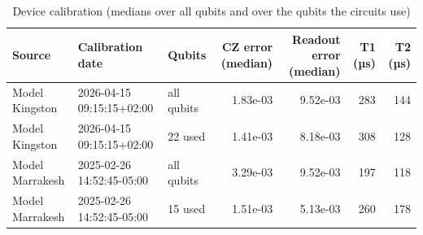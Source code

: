 \begin{table}[t]
\centering
\small
\caption{Device calibration (medians over all qubits and over the qubits the circuits use)}
\label{tab:calibration}
\begin{tabular}{lllrrrr}
\toprule
Source & Calibration date & Qubits & CZ error (median) & Readout error (median) & T1 (µs) & T2 (µs) \\
\midrule
Model Kingston & 2026-04-15 09:15:15+02:00 & all qubits & 1.83e-03 & 9.52e-03 & 283 & 144 \\
Model Kingston & 2026-04-15 09:15:15+02:00 & 22 used & 1.41e-03 & 8.18e-03 & 308 & 128 \\
Model Marrakesh & 2025-02-26 14:52:45-05:00 & all qubits & 3.29e-03 & 9.52e-03 & 197 & 118 \\
Model Marrakesh & 2025-02-26 14:52:45-05:00 & 15 used & 1.51e-03 & 5.13e-03 & 260 & 178 \\
\bottomrule
\end{tabular}
\end{table}
